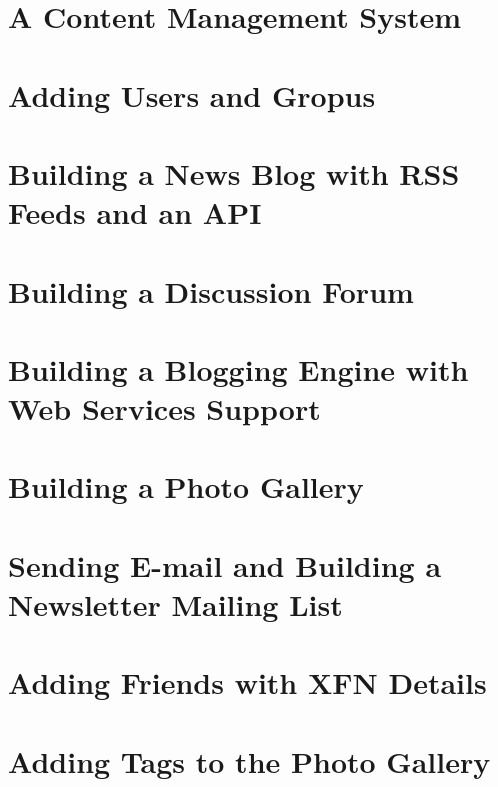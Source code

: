 \documentclass{beamer}
\begin{document}



\section{A Content Management System}
\section{Adding Users and Gropus}
\section{Building a News Blog with RSS Feeds and an API}
\section{Building a Discussion Forum}
\section{Building a Blogging Engine with Web Services Support}
\section{Building a Photo Gallery}
\section{Sending E-mail and Building a Newsletter Mailing List}
\section{Adding Friends with XFN Details}
\section{Adding Tags to the Photo Gallery}
\end{document}

